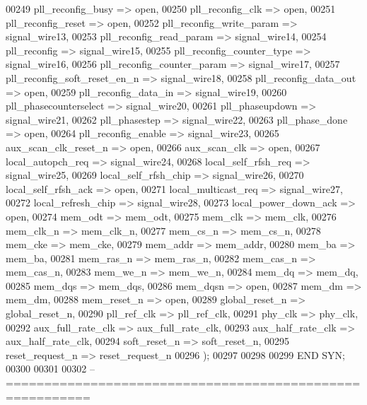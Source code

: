 \begin{DoxyCode}
{00249         pll_reconfig_busy  =>  \textcolor{keywordflow}{open},
00250         pll_reconfig_clk  =>  \textcolor{keywordflow}{open},
00251         pll_reconfig_reset  =>  \textcolor{keywordflow}{open},
00252         pll_reconfig_write_param  =>  signal_wire13,
00253         pll_reconfig_read_param  =>  signal_wire14,
00254         pll_reconfig  =>  signal_wire15,
00255         pll_reconfig_counter_type  =>  signal_wire16,
00256         pll_reconfig_counter_param  =>  signal_wire17,
00257         pll_reconfig_soft_reset_en_n  =>  signal_wire18,
00258         pll_reconfig_data_out  =>  \textcolor{keywordflow}{open},
00259         pll_reconfig_data_in  =>  signal_wire19,
00260         pll_phasecounterselect  =>  signal_wire20,
00261         pll_phaseupdown  =>  signal_wire21,
00262         pll_phasestep  =>  signal_wire22,
00263         pll_phase_done  =>  \textcolor{keywordflow}{open},
00264         pll_reconfig_enable  =>  signal_wire23,
00265         aux_scan_clk_reset_n  =>  \textcolor{keywordflow}{open},
00266         aux_scan_clk  =>  \textcolor{keywordflow}{open},
00267         local_autopch_req  =>  signal_wire24,
00268         local_self_rfsh_req  =>  signal_wire25,
00269         local_self_rfsh_chip  =>  signal_wire26,
00270         local_self_rfsh_ack  =>  \textcolor{keywordflow}{open},
00271         local_multicast_req  =>  signal_wire27,
00272         local_refresh_chip  =>  signal_wire28,
00273         local_power_down_ack  =>  \textcolor{keywordflow}{open},
00274         mem_odt  =>  mem_odt,
00275         mem_clk  =>  mem_clk,
00276         mem_clk_n  =>  mem_clk_n,
00277         mem_cs_n  =>  mem_cs_n,
00278         mem_cke  =>  mem_cke,
00279         mem_addr  =>  mem_addr,
00280         mem_ba  =>  mem_ba,
00281         mem_ras_n  =>  mem_ras_n,
00282         mem_cas_n  =>  mem_cas_n,
00283         mem_we_n  =>  mem_we_n,
00284         mem_dq  =>  mem_dq,
00285         mem_dqs  =>  mem_dqs,
00286         mem_dqsn  =>  \textcolor{keywordflow}{open},
00287         mem_dm  =>  mem_dm,
00288         mem_reset_n  =>  \textcolor{keywordflow}{open},
00289         global_reset_n  =>  global_reset_n,
00290         pll_ref_clk  =>  pll_ref_clk,
00291         phy_clk  =>  phy_clk,
00292         aux_full_rate_clk  =>  aux_full_rate_clk,
00293         aux_half_rate_clk  =>  aux_half_rate_clk,
00294         soft_reset_n  =>  soft_reset_n,
00295         reset_request_n  =>  reset_request_n
00296     \textcolor{vhdlchar}{)};
00297 
00298 
00299 \textcolor{keywordflow}{END} \textcolor{vhdlchar}{SYN};
00300 
00301 
00302 \textcolor{keyword}{-- =========================================================}
}
\end{DoxyCode}
